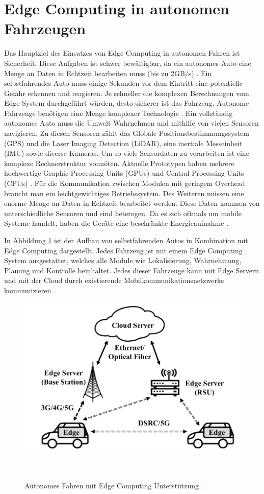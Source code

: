 \documentclass{sigchi}
\begin{document}
\section{Edge Computing in autonomen Fahrzeugen} \label{chap:edge-computing-autonomic-cars}
Das Hauptziel des Einsatzes von Edge Computing in autonomen Fahren ist Sicherheit. Diese Aufgaben ist schwer bewältigbar, da ein autonomes Auto eine Menge an Daten in Echtzeit bearbeiten muss (bis zu 2GB/s) \cite{architectures:2017}. Ein selbstfahrendes Auto muss einige Sekunden vor dem Eintritt eine potentielle Gefahr erkennen und reagieren. Je schneller die komplexen Berechnungen vom Edge System durchgeführt würden, desto sicherer ist das Fahrzeug. Autonome Fahrzeuge benötigen eine Menge komplexer Technologie \cite{opportunities-challenges:2019}.
Ein vollständig autonomes Auto muss die Umwelt Wahrnehmen und mithilfe von vielen Sensoren navigieren. Zu diesen Sensoren zählt das Globale Positionsbestimmungssystem (GPS) und die Laser Imaging Detection (LiDAR), eine inertiale Messeinheit (IMU) sowie diverse Kameras. Um so viele Sensordaten zu verarbeiten ist eine komplexe Rechnerstruktur vonnöten. Aktuelle Prototypen haben mehrere hochwertige Graphic Processing Units (GPUs) und Central Processing Units (CPUs) \cite{architectures:2017}. Für die Kommunikation zwischen Modulen mit geringem Overhead braucht man ein leichtgewichtiges Betriebssystem. Des Weiteren müssen eine enorme Menge an Daten in Echtzeit bearbeitet werden. Diese Daten kommen von unterschiedliche Sensoren und sind heterogen. Da es sich oftmals um mobile Systeme handelt, haben die Geräte eine beschränkte Energieaufnahme \cite{opportunities-challenges:2019}. 

In Abbildung \ref{fig:edge-computing-drive-infrastructure} ist der Aufbau von selbstfahrenden Autos in Kombination mit Edge Computing dargestellt. Jedes Fahrzeug ist mit einem Edge Computing System ausgestattet, welches alle Module wie Lokalisierung, Wahrnehmung, Planung und Kontrolle beinhaltet. Jedes dieser Fahrzeuge kann mit Edge Servern und mit der Cloud durch existierende Mobilkommunikationsnetzwerke kommunizieren \cite{opportunities-challenges:2019}.

\begin{figure}
\centering
  \includegraphics[width=0.70\columnwidth]{figures/edge-computing-drive-infrastructure.PNG}
  \caption{Autonomes Fahren mit Edge Computing Unterstützung \cite{opportunities-challenges:2019}.}~\label{fig:edge-computing-drive-infrastructure}
\end{figure}
\end{document}
